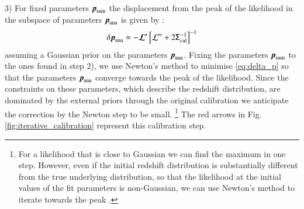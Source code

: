 \documentclass{aa}
\newcommand{\eq}[1]{\begin{equation}  #1 \end{equation}}
\begin{document}
3) For fixed parameters $\boldsymbol{p}_{\rm sam}$ the displacement from the peak of the likelihood in the subspace of parameters $\boldsymbol{p}_{\rm ana}$ is given by \citep{taylor10}:
\eq{
\label{eq:delta_p}
\delta\boldsymbol{p}_{\rm ana} = -\boldsymbol{\cal L^\prime}\left[{\cal L^{\prime\prime}}+2\tens{\Sigma}_{\rm cal}^{-1}\right]^{-1}
}
assuming a Gaussian prior on the parameters $\boldsymbol{p}_{\rm ana}$. Fixing the parameters $\boldsymbol{p}_{\rm sam}$ to the ones found in step 2), we use Newton's method to minimise \eqref{eq:delta_p} so that the parameters $\boldsymbol{p}_{\rm ana}$ converge towards the peak of the likelihood. Since the constraints on these parameters, which describe the redshift distribution, are dominated by the external priors through the original calibration we anticipate the correction by the Newton step to be small. \footnote{For a likelihood that is close to Gaussian we can find the maximum in one step. However, even if the initial redshift distribution is substantially different from the true underlying distribution, so that the likelihood at the initial values of the fit parameters is non-Gaussian, we can use Newton's method to iterate towards the peak \citep{taylor10}.} The red arrows in Fig. \ref{fig:iterative_calibration} represent this calibration step.  
\end{document}
